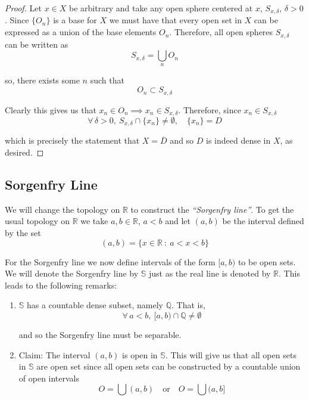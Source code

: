 \documentclass[12pt]{article}
\newlength\tindent
\renewcommand{\indent}{\hspace*{\tindent}}
\newcommand{\R}{\mathbb R}
\newcommand{\Q}{\mathbb Q}
\begin{document}
{\begin{proof}
\indent Let $x \in X$ be arbitrary and take any open sphere centered at $x$, $S_{x,\delta}$, $\delta > 0$. Since $\{O_n\}$ is a base for $X$ we must have that every open set in $X$ can be expressed as a union of the base elements $O_n$. Therefore, all open spheres $S_{x,\delta}$ can be written as
\begin{equation*}
	S_{x,\delta} = \bigcup_{n} O_n
\end{equation*}

so, there exists some $n$ such that
\begin{equation*}
	O_n \subset S_{x,\delta}
\end{equation*}

Clearly this gives us that $x_n \in O_n \implies x_n \in S_{x, \delta}$. Therefore, since $x_n \in S_{x, \delta}$
\begin{equation*}
	\forall\,\delta > 0,~ S_{x,\delta} \cap \{x_n\} \neq \emptyset, \quad \{x_n\} = D
\end{equation*}

which is precisely the statement that $X = \overline{D}$ and so $D$ is indeed dense in $X$, as desired.
\end{proof}

\subsection{Sorgenfry Line}

\indent We will change the topology on $\R$ to construct the {\em ``Sorgenfry line''}. To get the usual topology on $\R$ we take $a, b \in \R$, $a < b$ and let $(a, b)$ be the interval defined by the set
\begin{equation*}
	(a, b) = \{x \in \R ~:~ a < x < b \} 
\end{equation*}

\indent For the Sorgenfry line we now define intervals of the form $[a,b)$ to be open sets. We will denote the Sorgenfry line by $\mathbb S$ just as the real line is denoted by $\R$. This leads to the following remarks:
\begin{enumerate}
	\item $\mathbb S$ has a countable dense subset, namely $\Q$. That is,
	\begin{equation*}
		\forall\,a < b, ~ [a,b) \cap \Q \neq \emptyset
	\end{equation*}	 
	
	and so the Sorgenfry line must be separable.
	
	\item Claim: The interval $(a, b)$ is open in $\mathbb S$. This will give us that all open sets in $\mathbb S$ are open set since all open sets can be constructed by a countable union of open intervals
	\begin{equation*}
		O = \bigcup (a, b) \quad \text{or} \quad O = \bigcup (a, b]
	\end{equation*}
	

\end{enumerate}}
\end{document}
